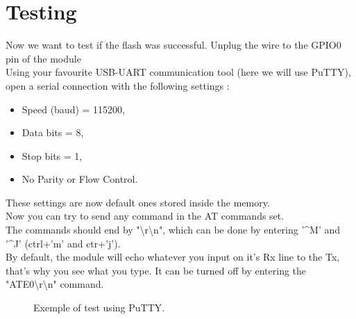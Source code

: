 \documentclass[11pt]{article}
\begin{document}
\section{Testing}
Now we want to test if the flash was successful. Unplug the wire to the GPIO0 pin of the module\\
Using your favourite USB-UART communication tool (here we will use PuTTY), open a serial connection with the following settings :
\begin{itemize}
\item Speed (baud) = 115200,
\item Data bits = 8,
\item Stop bits = 1,
\item No Parity or Flow Control.
\end{itemize}
These settings are now default ones stored inside the memory.\\
Now you can try to send any command in the AT commands set.\\
The commands should end by "\textbackslash r\textbackslash n", which can be done by entering '\textasciicircum M' and '\textasciicircum J' (ctrl+'m' and ctr+'j').\\
By default, the module will echo whatever you input on it's Rx line to the Tx, that's why you see what you type. It can be turned off by entering the "ATE0\textbackslash r\textbackslash n" command.\\
\begin{figure}[H]
\caption{Exemple of test using PuTTY.}
\label{putty_exemple}
\end{figure}
\end{document}
